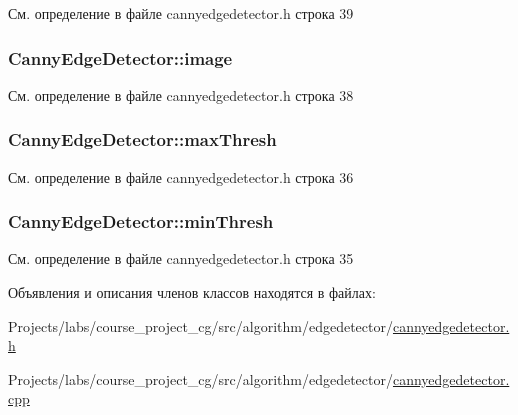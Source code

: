 См. определение в файле cannyedgedetector.\+h строка 39

\subsubsection[{\texorpdfstring{image}{image}}]{ Canny\+Edge\+Detector\+::image\hspace{0.3cm}{\ttfamily [private]}}\hypertarget{class_canny_edge_detector_a271e3c9036a5cb2611bb1b7da4d7d146}{}\label{class_canny_edge_detector_a271e3c9036a5cb2611bb1b7da4d7d146}


См. определение в файле cannyedgedetector.\+h строка 38

\subsubsection[{\texorpdfstring{max\+Thresh}{maxThresh}}]{ Canny\+Edge\+Detector\+::max\+Thresh\hspace{0.3cm}{\ttfamily [private]}}\hypertarget{class_canny_edge_detector_ab551b06077d0221f1caa6e5e4cce48d9}{}\label{class_canny_edge_detector_ab551b06077d0221f1caa6e5e4cce48d9}


См. определение в файле cannyedgedetector.\+h строка 36

\subsubsection[{\texorpdfstring{min\+Thresh}{minThresh}}]{ Canny\+Edge\+Detector\+::min\+Thresh\hspace{0.3cm}{\ttfamily [private]}}\hypertarget{class_canny_edge_detector_ae88472e936f883044b00e8cd50f662c6}{}\label{class_canny_edge_detector_ae88472e936f883044b00e8cd50f662c6}


См. определение в файле cannyedgedetector.\+h строка 35



Объявления и описания членов классов находятся в файлах\+:\begin{DoxyCompactItemize}
\item 
Projects/labs/course\+\_\+project\+\_\+cg/src/algorithm/edgedetector/\hyperlink{cannyedgedetector_8h}{cannyedgedetector.\+h}\item 
Projects/labs/course\+\_\+project\+\_\+cg/src/algorithm/edgedetector/\hyperlink{cannyedgedetector_8cpp}{cannyedgedetector.\+cpp}\end{DoxyCompactItemize}
